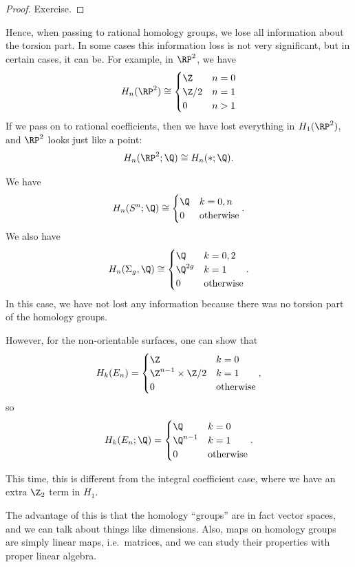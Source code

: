 \documentclass[a4paper]{article}
\begin{document}
\begin{proof}
  Exercise. %
\end{proof}
Hence, when passing to rational homology groups, we lose all information about the torsion part. In some cases this information loss is not very significant, but in certain cases, it can be. For example, in $\RP^2$, we have
\[
  H_n(\RP^2) \cong
  \begin{cases}
    \Z & n = 0\\
    \Z/2 & n = 1\\
    0 & n > 1
  \end{cases}
\]
If we pass on to rational coefficients, then we have lost everything in $H_1(\RP^2)$, and $\RP^2$ looks just like a point:
\[
  H_n(\RP^2; \Q) \cong H_n(*; \Q).
\]
\begin{eg}
  We have
  \[
    H_n(S^n; \Q) \cong
    \begin{cases}
      \Q & k = 0, n\\
      0 & \text{otherwise}
    \end{cases}.
  \]
  We also have
  \[
    H_n(\Sigma_g, \Q) \cong
    \begin{cases}
      \Q & k = 0, 2\\
      \Q^{2g} & k = 1\\
      0 & \text{otherwise}
    \end{cases}.
  \]
  In this case, we have not lost any information because there was no torsion part of the homology groups.

  However, for the non-orientable surfaces, one can show that
   \[
    H_k(E_n) =
    \begin{cases}
      \Z & k = 0\\
      \Z^{n - 1} \times \Z / 2 & k = 1\\
      0 & \text{otherwise}
    \end{cases},
  \] 
  so
  \[
    H_k(E_n; \Q) =
    \begin{cases}
      \Q & k = 0\\
      \Q^{n - 1} & k = 1\\
      0 & \text{otherwise}
    \end{cases}.
  \]

  This time, this is different from the integral coefficient case, where we have an extra $\Z_2$ term in $H_1$.
\end{eg}

The advantage of this is that the homology ``groups'' are in fact vector spaces, and we can talk about things like dimensions. Also, maps on homology groups are simply linear maps, i.e.\ matrices, and we can study their properties with proper linear algebra.
\end{document}

